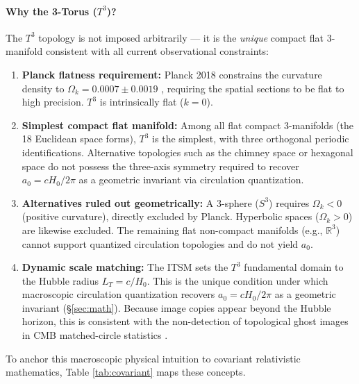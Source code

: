 \documentclass[aps,prd,10pt,twocolumn,superscriptaddress,nofootinbib,floatfix]{revtex4-2}
\begin{document}
\paragraph{Why the 3-Torus ($T^3$)?}
The $T^3$ topology is not imposed arbitrarily --- it is the \emph{unique} compact flat 3-manifold consistent with all current observational constraints:
\begin{enumerate}
    \item \textbf{Planck flatness requirement:} Planck 2018 constrains the curvature density to $\Omega_k = 0.0007 \pm 0.0019$ \cite{planck}, requiring the spatial sections to be flat to high precision. $T^3$ is intrinsically flat ($k = 0$).
    \item \textbf{Simplest compact flat manifold:} Among all flat compact 3-manifolds (the 18 Euclidean space forms), $T^3$ is the simplest, with three orthogonal periodic identifications. Alternative topologies such as the chimney space or hexagonal space do not possess the three-axis symmetry required to recover $a_0 = cH_0/2\pi$ as a geometric invariant via circulation quantization.
    \item \textbf{Alternatives ruled out geometrically:} A 3-sphere ($S^3$) requires $\Omega_k < 0$ (positive curvature), directly excluded by Planck. Hyperbolic spaces ($\Omega_k > 0$) are likewise excluded. The remaining flat non-compact manifolds (e.g., $\mathbb{R}^3$) cannot support quantized circulation topologies and do not yield $a_0$.
    \item \textbf{Dynamic scale matching:} The ITSM sets the $T^3$ fundamental domain to the Hubble radius $L_T = c/H_0$. This is the unique condition under which macroscopic circulation quantization recovers $a_0 = cH_0/2\pi$ as a geometric invariant (\S\ref{sec:math}). Because image copies appear beyond the Hubble horizon, this is consistent with the non-detection of topological ghost images in CMB matched-circle statistics \cite{planck_topology}.
\end{enumerate}

To anchor this macroscopic physical intuition to covariant relativistic mathematics, Table \ref{tab:covariant} maps these concepts.
\end{document}

